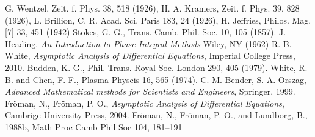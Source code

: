 \documentclass[aip,jmp,reprint]{revtex4-1}
\begin{document}
\begin{thebibliography}{10}
 G. Wentzel, Zeit. f. Phys. 38, 518 (1926), H. A. Kramers,
 Zeit. f. Phys. 39, 828 (1926), L. Brillion, C. R. Acad. Sci. Paris 183, 
24 (1926), H. Jeffries, Philos. Mag. [7] 33, 451 (1942)
 Stokes, G. G., Trans. Camb. Phil. Soc. 10, 105 (1857).
 J. Heading. {\it An Introduction to Phase Integral Methods} 
Wiley, NY (1962)
 R. B. White,
 {\it Asymptotic Analysis of Differential Equations}, Imperial College Press, 2010.
 Budden, K. G., Phil. Trans. Royal Soc. London 290, 405 (1979).
 White, R. B. and Chen, F. F., Plasma Physcis 16, 565 (1974).
 C. M. Bender, S. A. Orszag,
 {\it Advanced Mathematical methods for Scientists and Engineers}, Springer, 1999.
 Fr\"oman, N., Fr\"oman, P. O.,
 {\it Asymptotic Analysis of Differential Equations}, Cambrige University Press, 2004. 
 Fr\"oman, N., Fr\"oman, P. O., and Lundborg, B., 1988b, Math Proc Camb Phil Soc 104, 181–191
\end{thebibliography}
\end{document}
